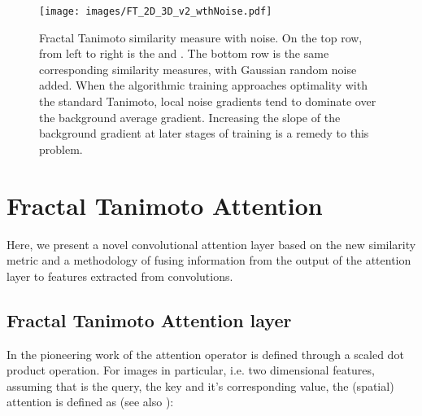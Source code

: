 \documentclass[times, 5p]{elsarticle}
\begin{document}
\begin{figure}
\centering
\texttt{[image: images/FT\_2D\_3D\_v2\_wthNoise.pdf]}
\caption{Fractal Tanimoto similarity measure with noise. On the top row, from left to right is the  and . 
The bottom row is the same corresponding  similarity measures, with Gaussian random noise added. When the algorithmic training approaches optimality with the standard Tanimoto, local noise gradients tend to dominate over the background average gradient. Increasing the slope of the background gradient at later stages of training is a remedy to this problem.}
\label{FracTanmtLoss3D_wthNoise}
\end{figure}
 


\section{Fractal Tanimoto Attention}
\label{section_fractal_tan_attention}

Here, we present a novel convolutional attention layer based on the new similarity metric and a methodology of fusing  information from the output of the attention layer to features extracted from convolutions. 


\subsection{Fractal Tanimoto Attention layer }

In the pioneering work of \cite{DBLP:journals/corr/VaswaniSPUJGKP17} the attention operator is defined through a scaled dot product operation. For images in particular, i.e. two dimensional features,  assuming that  is the query,  the key and  it's corresponding value, the (spatial) attention is defined as (see also \citealt{zhang2020dive}):
  
\end{document}
